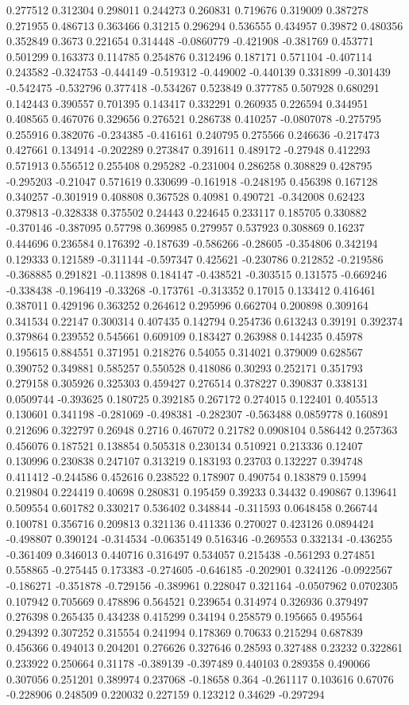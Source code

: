 0.277512 0.312304 0.298011 0.244273 0.260831 0.719676 0.319009 0.387278 0.271955 0.486713 0.363466 0.31215 0.296294 0.536555 0.434957 0.39872 0.480356 0.352849 0.3673 0.221654 0.314448 -0.0860779 -0.421908 -0.381769 0.453771 0.501299 0.163373 0.114785 0.254876 0.312496 0.187171 0.571104 -0.407114 0.243582 -0.324753 -0.444149 -0.519312 -0.449002 -0.440139 0.331899 -0.301439 -0.542475 -0.532796 0.377418 -0.534267 0.523849 0.377785 0.507928 0.680291 0.142443 0.390557 0.701395 0.143417 0.332291 0.260935 0.226594 0.344951 0.408565 0.467076 0.329656 0.276521 0.286738 0.410257 -0.0807078 -0.275795 0.255916 0.382076 -0.234385 -0.416161 0.240795 0.275566 0.246636 -0.217473 0.427661 0.134914 -0.202289 0.273847 0.391611 0.489172 -0.27948 0.412293 0.571913 0.556512 0.255408 0.295282 -0.231004 0.286258 0.308829 0.428795 -0.295203 -0.21047 0.571619 0.330699 -0.161918 -0.248195 0.456398 0.167128 0.340257 -0.301919 0.408808 0.367528 0.40981 0.490721 -0.342008 0.62423 0.379813 -0.328338 0.375502 0.24443 0.224645 0.233117 0.185705 0.330882 -0.370146 -0.387095 0.57798 0.369985 0.279957 0.537923 0.308869 0.16237 0.444696 0.236584 0.176392 -0.187639 -0.586266 -0.28605 -0.354806 0.342194 0.129333 0.121589 -0.311144 -0.597347 0.425621 -0.230786 0.212852 -0.219586 -0.368885 0.291821 -0.113898 0.184147 -0.438521 -0.303515 0.131575 -0.669246 -0.338438 -0.196419 -0.33268 -0.173761 -0.313352 0.17015 0.133412 0.416461 0.387011 0.429196 0.363252 0.264612 0.295996 0.662704 0.200898 0.309164 0.341534 0.22147 0.300314 0.407435 0.142794 0.254736 0.613243 0.39191 0.392374 0.379864 0.239552 0.545661 0.609109 0.183427 0.263988 0.144235 0.45978 0.195615 0.884551 0.371951 0.218276 0.54055 0.314021 0.379009 0.628567 0.390752 0.349881 0.585257 0.550528 0.418086 0.30293 0.252171 0.351793 0.279158 0.305926 0.325303 0.459427 0.276514 0.378227 0.390837 0.338131 0.0509744 -0.393625 0.180725 0.392185 0.267172 0.274015 0.122401 0.405513 0.130601 0.341198 -0.281069 -0.498381 -0.282307 -0.563488 0.0859778 0.160891 0.212696 0.322797 0.26948 0.2716 0.467072 0.21782 0.0908104 0.586442 0.257363 0.456076 0.187521 0.138854 0.505318 0.230134 0.510921 0.213336 0.12407 0.130996 0.230838 0.247107 0.313219 0.183193 0.23703 0.132227 0.394748 0.411412 -0.244586 0.452616 0.238522 0.178907 0.490754 0.183879 0.15994 0.219804 0.224419 0.40698 0.280831 0.195459 0.39233 0.34432 0.490867 0.139641 0.509554 0.601782 0.330217 0.536402 0.348844 -0.311593 0.0648458 0.266744 0.100781 0.356716 0.209813 0.321136 0.411336 0.270027 0.423126 0.0894424 -0.498807 0.390124 -0.314534 -0.0635149 0.516346 -0.269553 0.332134 -0.436255 -0.361409 0.346013 0.440716 0.316497 0.534057 0.215438 -0.561293 0.274851 0.558865 -0.275445 0.173383 -0.274605 -0.646185 -0.202901 0.324126 -0.0922567 -0.186271 -0.351878 -0.729156 -0.389961 0.228047 0.321164 -0.0507962 0.0702305 0.107942 0.705669 0.478896 0.564521 0.239654 0.314974 0.326936 0.379497 0.276398 0.265435 0.434238 0.415299 0.34194 0.258579 0.195665 0.495564 0.294392 0.307252 0.315554 0.241994 0.178369 0.70633 0.215294 0.687839 0.456366 0.494013 0.204201 0.276626 0.327646 0.28593 0.327488 0.23232 0.322861 0.233922 0.250664 0.31178 -0.389139 -0.397489 0.440103 0.289358 0.490066 0.307056 0.251201 0.389974 0.237068 -0.18658 0.364 -0.261117 0.103616 0.67076 -0.228906 0.248509 0.220032 0.227159 0.123212 0.34629 -0.297294 
